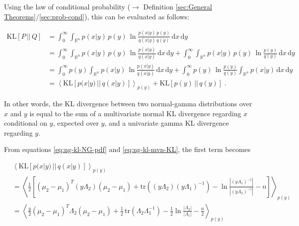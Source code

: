 \documentclass[a4paper,12pt,twoside]{book}
\begin{document}
Using the law of conditional probability ($\rightarrow$ Definition \ref{sec:General Theorems}/\ref{sec:prob-cond}), this can be evaluated as follows:

\begin{equation} \label{eq:ng-kl-NG-KL1}
\begin{split}
\mathrm{KL}[P\,||\,Q] &= \int_{0}^{\infty} \int_{\mathbb{R}^n} p(x|y) \, p(y) \, \ln \frac{p(x|y) \, p(y)}{q(x|y) \, q(y)} \, \mathrm{d}x \, \mathrm{d}y \\
&= \int_{0}^{\infty} \int_{\mathbb{R}^n} p(x|y)\, p(y) \, \ln \frac{p(x|y)}{q(x|y)} \, \mathrm{d}x \, \mathrm{d}y + \int_{0}^{\infty} \int_{\mathbb{R}^n} p(x|y)\, p(y) \, \ln \frac{p(y)}{q(y)} \, \mathrm{d}x \, \mathrm{d}y \\
&= \int_{0}^{\infty} p(y) \int_{\mathbb{R}^n} p(x|y) \, \ln \frac{p(x|y)}{q(x|y)} \, \mathrm{d}x \, \mathrm{d}y + \int_{0}^{\infty} p(y) \, \ln \frac{p(y)}{q(y)} \int_{\mathbb{R}^n} p(x|y) \, \mathrm{d}x \, \mathrm{d}y \\
&= \left\langle \mathrm{KL}[p(x|y)\,||\,q(x|y)] \right\rangle_{p(y)} + \mathrm{KL}[p(y)\,||\,q(y)] \; .
\end{split}
\end{equation}

In other words, the KL divergence between two normal-gamma distributions over $x$ and $y$ is equal to the sum of a multivariate normal KL divergence regarding $x$ conditional on $y$, expected over $y$, and a univariate gamma KL divergence regarding $y$.

\vspace{1em}
From equations \eqref{eq:ng-kl-NG-pdf} and \eqref{eq:ng-kl-mvn-KL}, the first term becomes

\begin{equation} \label{eq:ng-kl-exp-mvn-KL-s1}
\begin{split}
&\left\langle \mathrm{KL}[p(x|y)\,||\,q(x|y)] \right\rangle_{p(y)} \\
&= \left\langle \frac{1}{2} \left[ (\mu_2 - \mu_1)^T (y \Lambda_2) (\mu_2 - \mu_1) + \mathrm{tr}\left( (y \Lambda_2) (y \Lambda_1)^{-1} \right) - \ln \frac{|(y \Lambda_1)^{-1}|}{|(y \Lambda_2)^{-1}|} - n \right] \right\rangle_{p(y)} \\
&= \left\langle \frac{y}{2} (\mu_2 - \mu_1)^T \Lambda_2 (\mu_2 - \mu_1) + \frac{1}{2} \, \mathrm{tr}(\Lambda_2 \Lambda_1^{-1}) - \frac{1}{2} \ln \frac{|\Lambda_2|}{|\Lambda_1|} - \frac{n}{2} \right\rangle_{p(y)} \\
\end{split}
\end{equation}
\end{document}
